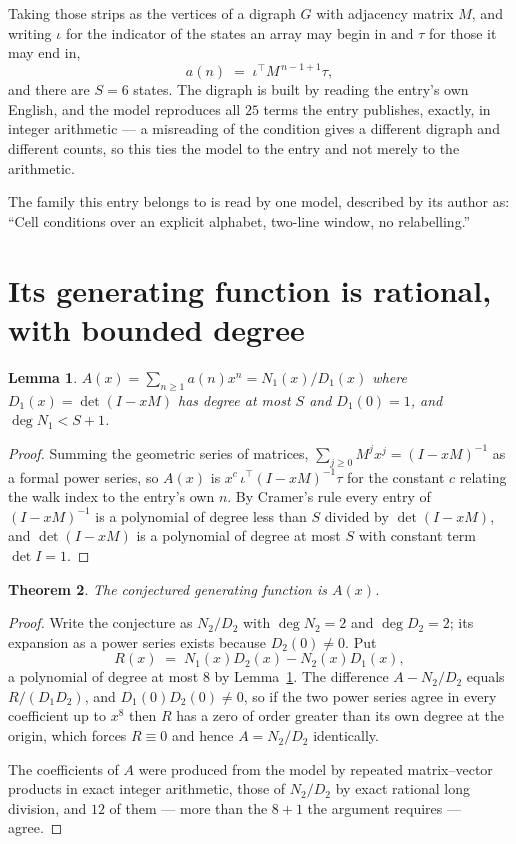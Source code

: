 \documentclass[11pt,a4paper]{article}
\theoremstyle{plain}
\newtheorem{theorem}{Theorem}
\newtheorem{lemma}[theorem]{Lemma}
\theoremstyle{definition}
\begin{document}
Taking those strips as the vertices of a digraph $G$ with adjacency matrix $M$, and writing
$\iota$ for the indicator of the states an array may begin in and $\tau$ for those it may end
in,
\[
a(n)\;=\;\iota^{\!\top}M^{\,n-1+1}\tau ,
\]
and there are $S=6$ states. The digraph is built by reading the entry's own English, and the
model reproduces all $25$ terms the entry publishes, exactly, in integer arithmetic --- a
misreading of the condition gives a different digraph and different counts, so this ties the
model to the entry and not merely to the arithmetic.

The family this entry belongs to is read by one model, described by its author as: ``Cell conditions over an explicit alphabet, two-line window, no relabelling.''


\section{Its generating function is rational, with bounded degree}

\begin{lemma}\label{lem:rat}
$A(x)=\sum_{n\ge1}a(n)x^n=N_1(x)/D_1(x)$ where $D_1(x)=\det(I-xM)$ has degree at most
$S$ and $D_1(0)=1$, and $\deg N_1<S+1$.
\end{lemma}

\begin{proof}
Summing the geometric series of matrices, $\sum_{j\ge0}M^jx^j=(I-xM)^{-1}$ as a formal
power series, so $A(x)$ is $x^{c}\,\iota^{\!\top}(I-xM)^{-1}\tau$ for the constant $c$
relating the walk index to the entry's own $n$. By Cramer's rule every entry of
$(I-xM)^{-1}$ is a polynomial of degree less than $S$ divided by $\det(I-xM)$, and
$\det(I-xM)$ is a polynomial of degree at most $S$ with constant term $\det I=1$.
\end{proof}

\begin{theorem}
The conjectured generating function is $A(x)$.
\end{theorem}

\begin{proof}
Write the conjecture as $N_2/D_2$ with $\deg N_2=2$ and $\deg D_2=2$; its expansion as a
power series exists because $D_2(0)\neq0$. Put
\[
R(x)\;=\;N_1(x)D_2(x)-N_2(x)D_1(x),
\]
a polynomial of degree at most $8$ by Lemma~\ref{lem:rat}. The difference
$A-N_2/D_2$ equals $R/(D_1D_2)$, and $D_1(0)D_2(0)\neq0$, so if the two power series agree in
every coefficient up to $x^{8}$ then $R$ has a zero of order greater than its own
degree at the origin, which forces $R\equiv0$ and hence $A=N_2/D_2$ identically.

The coefficients of $A$ were produced from the model by repeated matrix--vector products in
exact integer arithmetic, those of $N_2/D_2$ by exact rational long division, and $12$
of them --- more than the $8+1$ the argument requires --- agree.
\end{proof}
\end{document}
